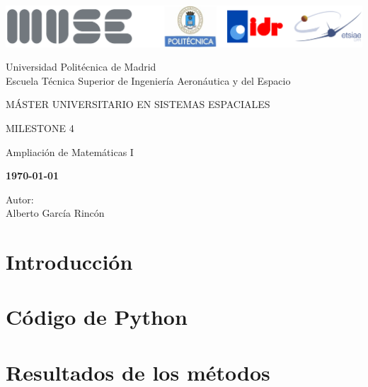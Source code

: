 \documentclass[12pt,a4paper]{article}
\begin{document}
	
\begin{titlepage}
	\centering
	\includegraphics[width=\textwidth]{FIGURES/Portada/Logo_portada.png} 
	\vspace{1.5cm}
	
	Universidad Politécnica de Madrid
	\\Escuela Técnica Superior de Ingeniería Aeronáutica y del Espacio
	\vspace{2cm}
	
	{\large MÁSTER UNIVERSITARIO EN SISTEMAS ESPACIALES}
	\vspace{2cm}
	
	{\LARGE MILESTONE 4}
	\vspace{1cm}
	
	{\large Ampliación de Matemáticas I}
	\vspace{4cm}
	
	\begin{center}
		\large{\textbf{\today}} \\
	\end{center}
	
	Autor: \\ Alberto García Rincón
	\vfill
\end{titlepage}

\newpage
\pagestyle{empty}
\tableofcontents	

\newpage
{}
\setcounter{page}{1}
\pagestyle{fancy} 

\section{Introducción}



\section{Código de Python}


\section{Resultados de los métodos}
\end{document}
